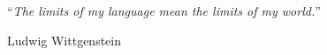 
\vspace*{0.2\textheight}

\noindent\enquote{\itshape The limits of my language mean the limits of my world.}\bigbreak

\hfill Ludwig Wittgenstein
\normalfont

